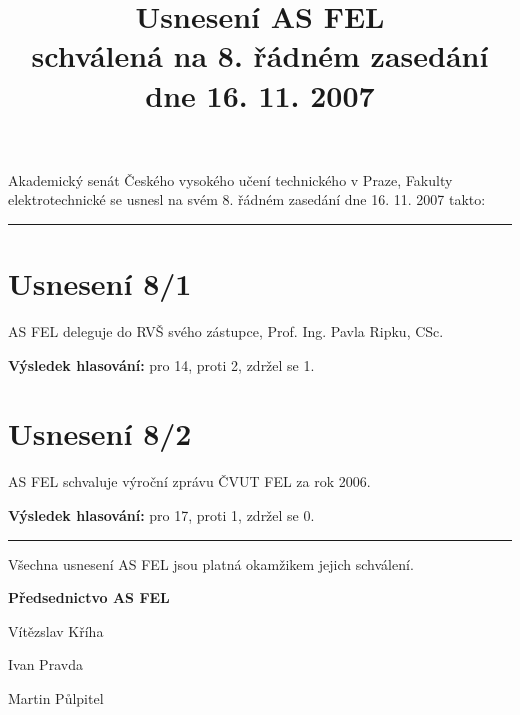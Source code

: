 \documentclass[a4paper,12pt,notitlepage]{article}
\title{Usnesení AS FEL\\schválená na 8. řádném zasedání dne 16. 11. 2007}
\author{}\date{}
\newcommand{\hr}{\bigskip\hrule\bigskip}
\newcommand{\usneseni}[5]{
\section*{#1}

#2

\textbf{Výsledek hlasování:} pro #3, proti #4, zdržel se #5.}
\begin{document}
\maketitle
\thispagestyle{empty}


Akademický senát Českého vysokého učení technického v Praze, Fakulty
elektrotechnické se usnesl na svém 8. řádném zasedání dne 16. 11. 2007 takto:\hr


\usneseni{Usnesení 8/1}{AS FEL deleguje do RVŠ svého zástupce, Prof. Ing. Pavla Ripku, CSc.}{14}{2}{1}


\usneseni{Usnesení 8/2}{AS FEL schvaluje výroční zprávu ČVUT FEL za rok 2006.}{17}{1}{0}

\hr
Všechna usnesení AS FEL jsou platná okamžikem jejich schválení.

\begin{center}
\textbf{Předsednictvo AS FEL}

Vítězslav Kříha

Ivan Pravda

Martin Půlpitel
\end{center}
\end{document}
